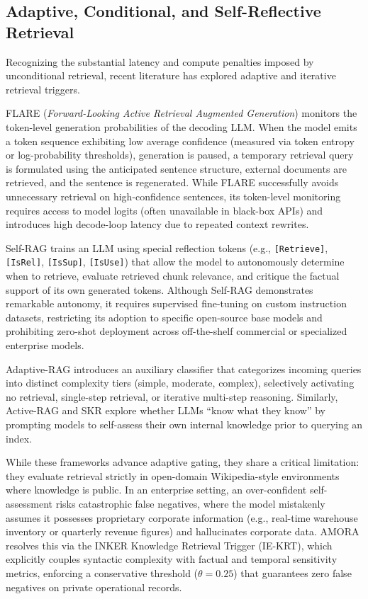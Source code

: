 \subsection{Adaptive, Conditional, and Self-Reflective Retrieval}
Recognizing the substantial latency and compute penalties imposed by unconditional retrieval, recent literature has explored adaptive and iterative retrieval triggers.

FLARE (\textit{Forward-Looking Active Retrieval Augmented Generation}) \cite{jiang2023flare} monitors the token-level generation probabilities of the decoding LLM. When the model emits a token sequence exhibiting low average confidence (measured via token entropy or log-probability thresholds), generation is paused, a temporary retrieval query is formulated using the anticipated sentence structure, external documents are retrieved, and the sentence is regenerated. While FLARE successfully avoids unnecessary retrieval on high-confidence sentences, its token-level monitoring requires access to model logits (often unavailable in black-box APIs) and introduces high decode-loop latency due to repeated context rewrites.

Self-RAG \cite{asai2023selfrag} trains an LLM using special reflection tokens (e.g., \texttt{[Retrieve]}, \texttt{[IsRel]}, \texttt{[IsSup]}, \texttt{[IsUse]}) that allow the model to autonomously determine when to retrieve, evaluate retrieved chunk relevance, and critique the factual support of its own generated tokens. Although Self-RAG demonstrates remarkable autonomy, it requires supervised fine-tuning on custom instruction datasets, restricting its adoption to specific open-source base models and prohibiting zero-shot deployment across off-the-shelf commercial or specialized enterprise models.

Adaptive-RAG \cite{jeong2024adaptiverag} introduces an auxiliary classifier that categorizes incoming queries into distinct complexity tiers (simple, moderate, complex), selectively activating no retrieval, single-step retrieval, or iterative multi-step reasoning. Similarly, Active-RAG and SKR \cite{wang2023skr} explore whether LLMs ``know what they know'' by prompting models to self-assess their own internal knowledge prior to querying an index.

While these frameworks advance adaptive gating, they share a critical limitation: they evaluate retrieval strictly in open-domain Wikipedia-style environments where knowledge is public. In an enterprise setting, an over-confident self-assessment risks catastrophic false negatives, where the model mistakenly assumes it possesses proprietary corporate information (e.g., real-time warehouse inventory or quarterly revenue figures) and hallucinates corporate data. AMORA resolves this via the INKER Knowledge Retrieval Trigger (IE-KRT), which explicitly couples syntactic complexity with factual and temporal sensitivity metrics, enforcing a conservative threshold ($\theta = 0.25$) that guarantees zero false negatives on private operational records.

